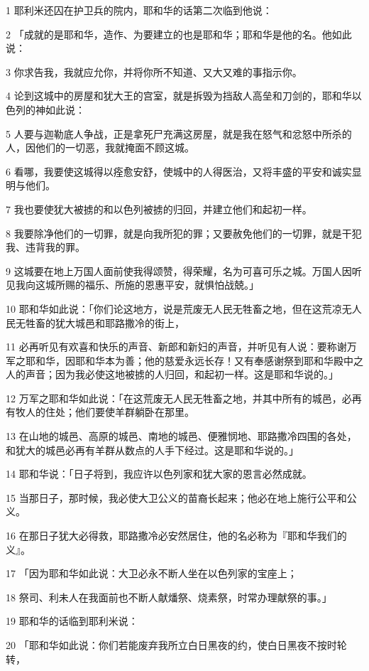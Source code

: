\par 1 耶利米还囚在护卫兵的院内，耶和华的话第二次临到他说：
\par 2 「成就的是耶和华，造作、为要建立的也是耶和华；耶和华是他的名。他如此说：
\par 3 你求告我，我就应允你，并将你所不知道、又大又难的事指示你。
\par 4 论到这城中的房屋和犹大王的宫室，就是拆毁为挡敌人高垒和刀剑的，耶和华以色列的神如此说：
\par 5 人要与迦勒底人争战，正是拿死尸充满这房屋，就是我在怒气和忿怒中所杀的人，因他们的一切恶，我就掩面不顾这城。
\par 6 看哪，我要使这城得以痊愈安舒，使城中的人得医治，又将丰盛的平安和诚实显明与他们。
\par 7 我也要使犹大被掳的和以色列被掳的归回，并建立他们和起初一样。
\par 8 我要除净他们的一切罪，就是向我所犯的罪；又要赦免他们的一切罪，就是干犯我、违背我的罪。
\par 9 这城要在地上万国人面前使我得颂赞，得荣耀，名为可喜可乐之城。万国人因听见我向这城所赐的福乐、所施的恩惠平安，就惧怕战兢。」
\par 10 耶和华如此说：「你们论这地方，说是荒废无人民无牲畜之地，但在这荒凉无人民无牲畜的犹大城邑和耶路撒冷的街上，
\par 11 必再听见有欢喜和快乐的声音、新郎和新妇的声音，并听见有人说：要称谢万军之耶和华，因耶和华本为善；他的慈爱永远长存！又有奉感谢祭到耶和华殿中之人的声音；因为我必使这地被掳的人归回，和起初一样。这是耶和华说的。」
\par 12 万军之耶和华如此说：「在这荒废无人民无牲畜之地，并其中所有的城邑，必再有牧人的住处；他们要使羊群躺卧在那里。
\par 13 在山地的城邑、高原的城邑、南地的城邑、便雅悯地、耶路撒冷四围的各处，和犹大的城邑必再有羊群从数点的人手下经过。这是耶和华说的。」
\par 14 耶和华说：「日子将到，我应许以色列家和犹大家的恩言必然成就。
\par 15 当那日子，那时候，我必使大卫公义的苗裔长起来；他必在地上施行公平和公义。
\par 16 在那日子犹大必得救，耶路撒冷必安然居住，他的名必称为『耶和华我们的义』。
\par 17 「因为耶和华如此说：大卫必永不断人坐在以色列家的宝座上；
\par 18 祭司、利未人在我面前也不断人献燔祭、烧素祭，时常办理献祭的事。」
\par 19 耶和华的话临到耶利米说：
\par 20 「耶和华如此说：你们若能废弃我所立白日黑夜的约，使白日黑夜不按时轮转，
